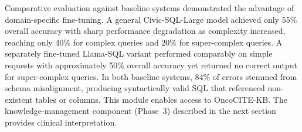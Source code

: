 Comparative evaluation against baseline systems demonstrated the advantage of domain-specific fine-tuning. A general Civic-SQL-Large model achieved only 55\% overall accuracy with sharp performance degradation as complexity increased, reaching only 40\% for complex queries and 20\% for super-complex queries. A separately fine-tuned Llama-SQL variant performed comparably on simple requests with approximately 50\% overall accuracy yet returned no correct output for super-complex queries. In both baseline systems, 84\% of errors stemmed from schema misalignment, producing syntactically valid SQL that referenced non-existent tables or columns. This module enables access to OncoCITE-KB. The knowledge-management component (Phase~3) described in the next section provides clinical interpretation.

%
%
%
%
%

%
%
%
%
%
%
%

